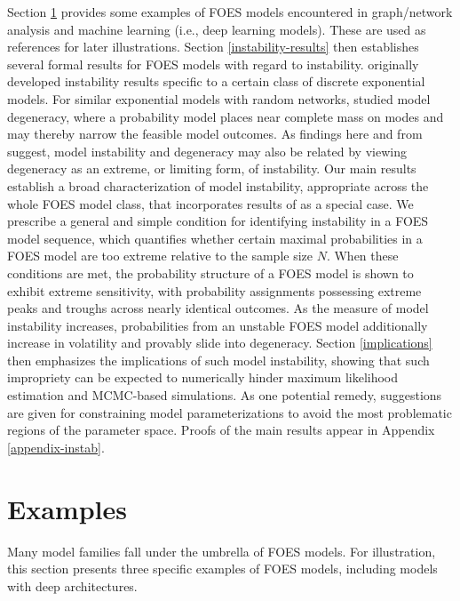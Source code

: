 \documentclass[numbib]{imamat}
\theoremstyle{theorem}
\theoremstyle{lemma}
\theoremstyle{example}
\theoremstyle{corollary}
\theoremstyle{definition}
\theoremstyle{remark}
\theoremstyle{approximation}
\theoremstyle{scheme}
\begin{document}
Section \ref{examples} provides some examples of FOES models encountered
in graph/network analysis and machine learning (i.e., deep learning
models). These are used as references for later illustrations. Section
\ref{instability-results} then establishes several formal results for
FOES models with regard to instability.
\citet{schweinberger2011instability} originally developed instability
results specific to a certain class of discrete exponential models. For
similar exponential models with random networks,
\citet{handcock2003assessing} studied model degeneracy, where a
probability model places near complete mass on modes and may thereby
narrow the feasible model outcomes. As findings here and from
\citet{schweinberger2011instability} suggest, model instability and
degeneracy may also be related by viewing degeneracy as an extreme, or
limiting form, of instability. Our main results establish a broad
characterization of model instability, appropriate across the whole FOES
model class, that incorporates results of
\citet{schweinberger2011instability} as a special case. We prescribe a
general and simple condition for identifying instability in a FOES model
sequence, which quantifies whether certain maximal probabilities in a
FOES model are too extreme relative to the sample size \(N\). When these
conditions are met, the probability structure of a FOES model is shown
to exhibit extreme sensitivity, with probability assignments possessing
extreme peaks and troughs across nearly identical outcomes. As the
measure of model instability increases, probabilities from an unstable
FOES model additionally increase in volatility and provably slide into
degeneracy. Section \ref{implications} then emphasizes the implications
of such model instability, showing that such impropriety can be expected
to numerically hinder maximum likelihood estimation and MCMC-based
simulations. As one potential remedy, suggestions are given for
constraining model parameterizations to avoid the most problematic
regions of the parameter space. Proofs of the main results appear in
Appendix \ref{appendix-instab}.

\hypertarget{examples}{%
\section{Examples}\label{examples}}

Many model families fall under the umbrella of FOES models. For
illustration, this section presents three specific examples of FOES
models, including models with deep architectures.
\end{document}
